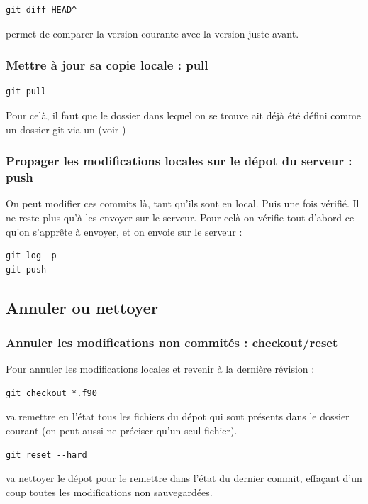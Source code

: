 \documentclass[a4paper,twoside]{article}
\begin{document}
\begin{exemple}
\begin{verbatim}
git diff HEAD^
\end{verbatim}
permet de comparer la version courante avec la version juste avant.
\end{exemple}

\subsubsection{Mettre à jour sa copie locale : pull} 
\begin{verbatim}
git pull
\end{verbatim}

Pour celà, il faut que le dossier dans lequel on se trouve ait déjà été défini comme un dossier git via un  (voir )

\subsubsection{Propager les modifications locales sur le dépot du serveur : push}
On peut modifier ces commits là, tant qu'ils sont en local. Puis une fois vérifié. Il ne reste plus qu'à les envoyer sur le serveur. Pour celà on vérifie tout d'abord ce qu'on s'apprête à envoyer, et on envoie sur le serveur : 
\begin{verbatim}
git log -p
git push
\end{verbatim}

\subsection{Annuler ou nettoyer}
\subsubsection{Annuler les modifications non commités : checkout/reset}
Pour annuler les modifications locales et revenir à la dernière révision : 
\begin{verbatim}
git checkout *.f90
\end{verbatim}
va remettre en l'état tous les fichiers du dépot qui sont présents dans le dossier courant (on peut aussi ne préciser qu'un seul fichier).

\bigskip

\begin{verbatim}
git reset --hard
\end{verbatim}
va nettoyer le dépot pour le remettre dans l'état du dernier commit, effaçant d'un coup toutes les modifications non sauvegardées.
\end{document}
